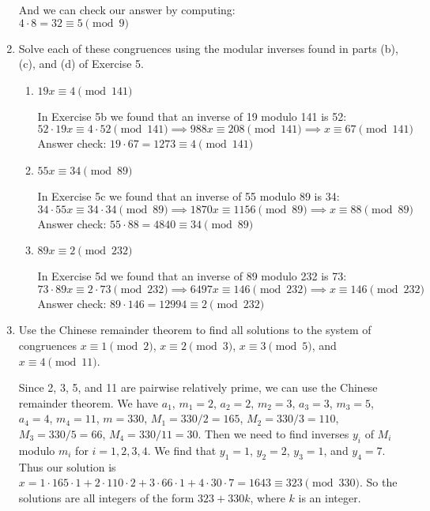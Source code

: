 \documentclass[11pt]{article}
\begin{document}
\begin{enumerate}[label=\textbf{\arabic*.}]
	And we can check our answer by computing: \\
	
	$4 \cdot 8 = 32 \equiv 5 \pmod{9}$
	
	\item Solve each of these congruences using the modular inverses found in parts (b), (c), and (d) of Exercise 5.
	
	\begin{enumerate}[label=\textbf{\alph*)}]
		\item $19x \equiv 4 \pmod{141}$
		
		In Exercise 5b we found that an inverse of 19 modulo 141 is 52: \\
		
		$52 \cdot 19x \equiv 4 \cdot 52 \pmod{141} \implies 988x \equiv 208 \pmod{141} \implies x \equiv 67 \pmod{141}$ \\
		
		Answer check: $19 \cdot 67 = 1273 \equiv 4 \pmod{141}$
		
		\item $55x \equiv 34 \pmod{89}$
		
		In Exercise 5c we found that an inverse of 55 modulo 89 is 34: \\
		
		$34 \cdot 55x \equiv 34 \cdot 34 \pmod{89} \implies 1870x \equiv 1156 \pmod{89} \implies x \equiv 88 \pmod{89}$ \\
		
		Answer check: $55 \cdot 88 = 4840 \equiv 34 \pmod{89}$
		
		\item $89x \equiv 2 \pmod{232}$
		
		In Exercise 5d we found that an inverse of 89 modulo 232 is 73: \\
		
		$73 \cdot 89x \equiv 2 \cdot 73 \pmod{232} \implies 6497x \equiv 146 \pmod{232} \implies x \equiv 146 \pmod{232}$ \\
		
		Answer check: $89 \cdot 146 = 12994 \equiv 2 \pmod{232}$
	\end{enumerate}

	\item Use the Chinese remainder theorem to find all solutions to the system of congruences $x \equiv 1 \pmod{2}$, $x \equiv 2 \pmod{3}$, $x \equiv 3 \pmod{5}$, and $x \equiv 4 \pmod{11}$.
	
	Since 2, 3, 5, and 11 are pairwise relatively prime, we can use the Chinese remainder theorem. We have $a_1$, $m_1 = 2$, $a_2 = 2$, $m_2 = 3$, $a_3 = 3$, $m_3 = 5$, $a_4 = 4$, $m_4 = 11$, $m = 330$, $M_1 = 330 / 2 = 165$, $M_2 = 330 / 3 = 110$, $M_3 = 330 / 5 = 66$, $M_4 = 330 / 11 = 30$. Then we need to find inverses $y_i$ of $M_i$ modulo $m_i$ for $i = 1, 2, 3, 4$. We find that $y_1 = 1$, $y_2 = 2$, $y_3 = 1$, and $y_4 = 7$. Thus our solution is $x = 1 \cdot 165 \cdot 1 + 2 \cdot 110 \cdot 2 + 3 \cdot 66 \cdot 1 + 4 \cdot 30 \cdot 7 = 1643 \equiv 323 \pmod{330}$. So the solutions are all integers of the form $323 + 330k$, where $k$ is an integer.
	

\end{enumerate}
\end{document}

